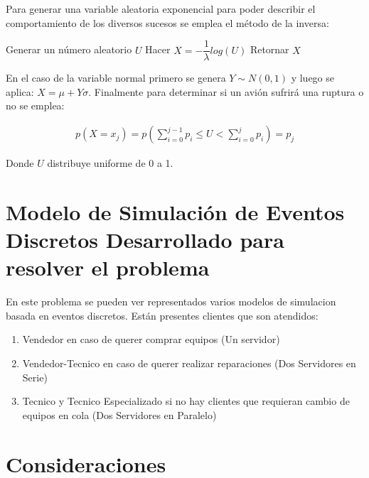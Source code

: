 \documentclass[a4paper,10pt,twocolumn]{article}
\begin{document}
		Para generar una variable aleatoria exponencial para poder describir el comportamiento de los diversos sucesos se emplea el m\'etodo de la inversa:
		
		\begin{algorithmic}[1]
			\STATE Generar un n\'umero aleatorio $U$
			\STATE Hacer $X = - \dfrac{1}{\lambda} log(U)$ 
			\STATE Retornar $X$
		\end{algorithmic}

		En el caso de la variable normal primero se genera $Y \sim N(0,1)$ y luego se aplica: $X = \mu + Y\sigma$. Finalmente para determinar si un avi\'on sufrir\'a una ruptura o no se emplea:
		
		\begin{align*}
			p\left(X = x_{j}\right) = p\left(\sum_{i=0}^{j-1} p_{i} \leq U < \sum_{i=0}^{j}p_{i} \right) = p_{j}
		\end{align*}

		Donde $U$ distribuye uniforme de 0 a 1. 



\section{Modelo de Simulación de Eventos Discretos Desarrollado para resolver el problema} \label{sub:listings}
En este problema se pueden ver representados varios modelos de simulacion basada en eventos discretos. Están presentes clientes que son atendidos:
\begin{enumerate}[label=\roman*)]
	\item Vendedor en caso de querer comprar equipos (Un servidor)
	\item Vendedor-Tecnico en caso de querer realizar reparaciones (Dos Servidores en Serie)
	\item Tecnico y Tecnico Especializado si no hay clientes que requieran cambio de equipos en cola (Dos Servidores en Paralelo)
\end{enumerate}

\section{Consideraciones}
\end{document}

